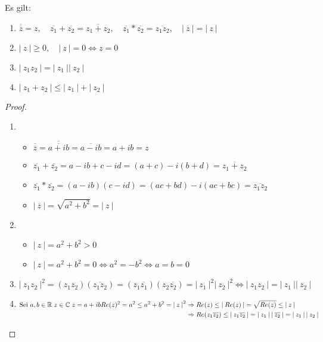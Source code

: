 \documentclass[a4paper,titlepage,oneside]{article}
\def\C{\ensuremath{\mathbb{C}} }
\def\R{\ensuremath{\mathbb{R}} }
\def\im{\ensuremath{\mathit{i}} }
\def\sp{\hspace{0,1cm}}
\newcommand{\abs}[1]{\ensuremath{\left|\:#1\:\right|}}
\theoremstyle{thmstyle}
\begin{document}
\begin{prop}
Es gilt:
\begin{enumerate}[label=(\roman*)]
\item \( \overline{\overline{z}} = z, \quad \overline{z_1} + \overline{z_2} = \overline{z_1 + z_2}, \quad \overline{z_1}* \overline{z_2} = \overline{z_1  z_2}, \quad \abs{\overline{z}} = \abs{z} \)
\item \( \abs{z} \ge 0, \quad \abs{z} = 0 \Leftrightarrow z = 0\)
\item \(\abs{z_1 z_2} = \abs{z_1} \abs{z_2}\)
\item \(\abs{z_1 + z_2} \le \abs{z_1} + \abs{z_2}\)
\end{enumerate}
\begin{proof} \sp
\begin{enumerate}[label=(\roman*)]
\item
\begin{itemize}
\item \(\overline{\overline{z}} = \overline{\overline{a + \im b}} = \overline{a - \im b} = a + \im b = z \)
\item \(\overline{z_1} + \overline{z_2} = a - \im b + c - \im d = (a + c) - \im (b + d) = \overline{z_1 + z_2} \)
\item \(\overline{z_1} * \overline{z_2} = (a - \im b) (c - \im d) = (ac + bd) - \im (ac + bc) = \overline{z_1  z_2} \)
\item \( \abs{\overline{z}} = \sqrt{a^2 + b^2} = \abs{z}\)
\end{itemize}
\item
\begin{itemize}
\item \(\abs{z} = a^2 + b^2 > 0 \)
\item \(\abs{z} = a^2 + b^2 = 0 \Leftrightarrow a^2 = - b^2 \Leftrightarrow a = b = 0 \)
\end{itemize}
\item \(\abs{z_1 z_2}^2 = (z_1 z_2)(\overline{z_1 z_2}) = (z_1\overline{z_1})(z_2\overline{z_2}) = \abs{z_1}^2\abs{z_2}^2 \Leftrightarrow \abs{z_1 z_2} = \abs{z_1}\abs{z_2} \)
\item  \begin{math}
\text{Sei }a, b \in \R \sp z \in \C \sp z = a + \im b \\
\begin{aligned}[t]
Re(z)^2 = a^2 \le a^2 + b^2 = \abs{z}^2 &\Rightarrow Re(z) \le \abs{Re(z)} = \sqrt{Re(z)} \le \abs{z} \\
&\Rightarrow Re(z_1\overline{z_2}) \le \abs{z_1\overline{z_2}} = \abs{z_1}\abs{\overline{z_2}} = \abs{z_1}\abs{z_2} \\

\end{aligned}
\end{math}
\end{enumerate}
\end{proof}
\end{prop}
\end{document}
